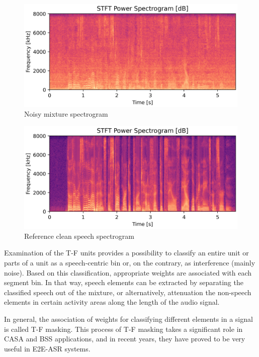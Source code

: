 \begin{figure}[H]
    \centering
    \includegraphics[width=\linewidth]{Features/images/noisy_specgram}
    \caption{Noisy mixture spectrogram}\label{fig:noisy_specgram}
\end{figure}
\begin{figure}[H]
    \centering
    \includegraphics[width=\linewidth]{Features/images/clean_specgram}
    \caption{Reference clean speech spectrogram}\label{fig:clean_specgram}
\end{figure}

Examination of the T-F units provides a 
possibility to classify an entire unit
or parts of a unit 
as a speech-centric bin or, on the contrary, 
as interference (mainly noise). 
Based on this classification, 
appropriate weights are associated with each segment bin.
In that way, speech elements can be extracted 
by separating the classified speech 
out of the mixture, or alternatively, 
attenuation the non-speech elements 
in certain activity areas 
along the length of the audio signal.

In general, the association of weights for classifying different
elements in a signal is called T-F masking. 
This process of T-F masking takes a 
significant role in CASA and BSS applications, 
and in recent years, they have proved to be 
very useful in E2E-ASR systems.

